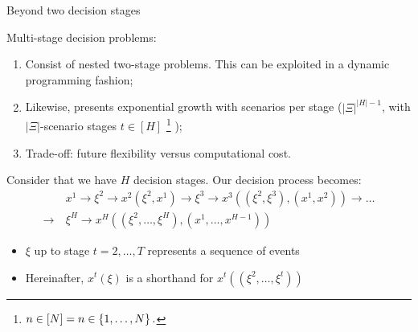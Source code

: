 \begin{frame}{Beyond two decision stages} 

	\alert{Multi-stage} decision problems:
	\vspace{-6pt}
	\begin{enumerate}
		\item Consist of \alert{nested two-stage problems}. This can be exploited in a \alert{dynamic programming} fashion;
		\item Likewise, presents \alert{exponential growth} with scenarios per stage ($|\Xi|^{|H|-1}$, with $|\Xi|$-scenario stages $t \in [H]$%
		\footnote{$n \in [N] = n \in \left\{ 1,\dots,N \right \}.$}
		);
		\item Trade-off: future \alert{flexibility} versus computational cost.	
	\end{enumerate}
	
	\pause
	Consider that we have $H$ decision stages. Our decision process becomes:
	\begin{align*}
		& x^1 \rightarrow \xi^2 \rightarrow x^2(\xi^2,x^1)
	 	 \rightarrow \xi^3
	 	 \rightarrow x^3((\xi^2,\xi^3), (x^1,x^2)) \rightarrow \dots \\\rightarrow 	
	 	 ~& \xi^H \rightarrow x^H((\xi^2,\dots,\xi^H), (x^1,\dots,x^{H-1}))
	\end{align*}
	
	\vspace{-6pt}	
	\begin{itemize}
		\item $\xi$ up to stage $t= 2, \dots, T$ represents a \alert{sequence} of events
		\item Hereinafter, $x^t(\xi)$ is a shorthand for $x^t((\xi^2,\dots,\xi^t))$ \vspace{6pt}	
	\end{itemize}
	 

\end{frame}

